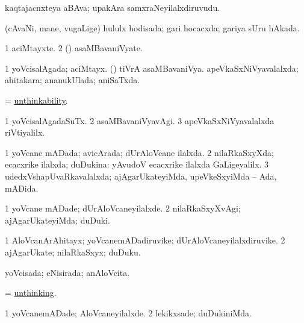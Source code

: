 \bentry
{} 
\gl{\nA}
\expl{}
\bmng
kaqtajacnxteya aBAva; upakAra samxraNeyilalxdiruvudu. 
\emng
\eentry

\bentry
{} 
\gl{\gu}
\expl{}
\bmng
(cAvaNi, mane, \mo vugaLige) hululx hodisada; gari hocacxda; gariya sUru hAkada. 
\emng
\eentry

\bentry
{} 
\gl{\nA}
\expl{}
\bmng
\bnum
\num{1} aciMtayxte. 
\num{2} (\AmA) asaMBavaniVyate. 
\enum
\emng
\eentry

\bentry
{} 
\gl{\gu}
\expl{}
\bmng
\bnum
\num{1} yoVcisalAgada; aciMtayx. 
 (\AmA) 
\banum
{} tiVrA asaMBavaniVya. 
 apeVkaSxNiVyavalalxda; ahitakara; ananukUlada; aniSaTxda. 
\eanum
\numie
\enum
\emng
\eentry

\bentry
{} 
\gl{\nA}
\expl{}
\bmng
= \hyperlink{unthinkability}{unthinkability}. 
\emng
\eentry

\bentry
{} 
\gl{\kirxvi}
\expl{}
\bmng
\bnum
\num{1} yoVcisalAgadaSuTx. 
\num{2} asaMBavaniVyavAgi. 
\num{3} apeVkaSxNiVyavalalxda riVtiyalilx. 
\enum
\emng
\eentry

\bentry
{} 
\gl{\gu}
\expl{}
\bmng
\bnum
\num{1} yoVcane mADada; avicArada; dUrAloVcane ilalxda. 
\num{2} nilaRkaSxyXda; ecacxrike ilalxda; duDukina:  yAvudoV ecacxrike ilalxda GaLigeyalilx. 
\num{3} udedxVshapUvaRkavalalxda; ajAgarUkateyiMda, upeVkeSxyiMda -- Ada, mADida. 
\enum
\emng
\eentry

\bentry
{} 
\gl{\kirxvi}
\expl{}
\bmng
\bnum
\num{1} yoVcane mADade; dUrAloVcaneyilalxde. 
\num{2} nilaRkaSxyXvAgi; ajAgarUkateyiMda; duDuki. 
\enum
\emng
\eentry

\bentry
{} 
\gl{\nA}
\expl{}
\bmng
\bnum
\num{1} AloVcanArAhitayx; yoVcanemADadiruvike; dUrAloVcaneyilalxdiruvike. 
\num{2} ajAgarUkate; nilaRkaSxyx; duDuku. 
\enum
\emng
\eentry

\bentry
{} 
\gl{\gu}
\expl{}
\bmng
yoVcisada; eNisirada; anAloVcita. 
\emng
\eentry

\bentry
{} 
\gl{\gu}
\expl{}
\bmng
= \hyperlink{unthinking}{unthinking}. 
\emng
\eentry

\bentry
{} 
\gl{\kirxvi}
\expl{}
\bmng
\bnum
\num{1} yoVcanemADade; AloVcaneyilalxde. 
\num{2} lekikxsade; duDukiniMda. 
\enum
\emng
\eentry

